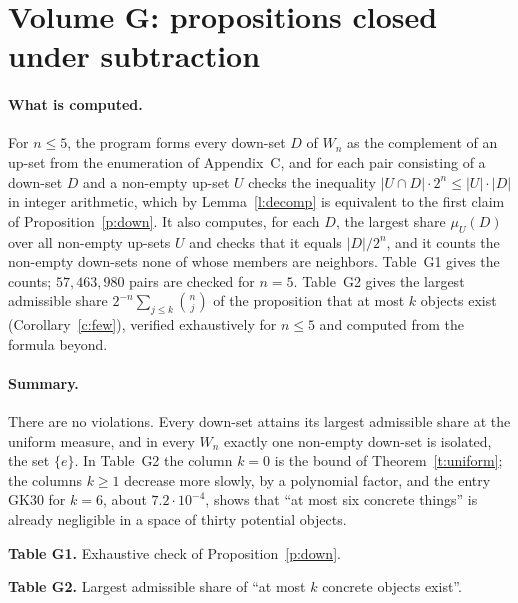 \documentclass{situationist-preprint}
\begin{document}


\section{Volume G: propositions closed under subtraction}\label{app:g}

\paragraph{What is computed.} For $n \leq 5$, the program forms every down-set $D$ of $W_n$ as the complement of an up-set from the enumeration of Appendix~C, and for each pair consisting of a down-set $D$ and a non-empty up-set $U$ checks the inequality $|U \cap D| \cdot 2^n \leq |U| \cdot |D|$ in integer arithmetic, which by Lemma~\ref{l:decomp} is equivalent to the first claim of Proposition~\ref{p:down}. It also computes, for each $D$, the largest share $\mu_U(D)$ over all non-empty up-sets $U$ and checks that it equals $|D|/2^n$, and it counts the non-empty down-sets none of whose members are neighbors. Table~G1 gives the counts; $57{,}463{,}980$ pairs are checked for $n = 5$. Table~G2 gives the largest admissible share $2^{-n}\sum_{j \leq k}\binom{n}{j}$ of the proposition that at most $k$ objects exist (Corollary~\ref{c:few}), verified exhaustively for $n \leq 5$ and computed from the formula beyond.

\paragraph{Summary.} There are no violations. Every down-set attains its largest admissible share at the uniform measure, and in every $W_n$ exactly one non-empty down-set is isolated, the set $\{e\}$. In Table~G2 the column $k = 0$ is the bound of Theorem~\ref{t:uniform}; the columns $k \geq 1$ decrease more slowly, by a polynomial factor, and the entry GK30 for $k = 6$, about $7.2 \cdot 10^{-4}$, shows that \enquote{at most six concrete things} is already negligible in a space of thirty potential objects.

\begin{center}
\textbf{Table G1.} Exhaustive check of Proposition~\ref{p:down}.\\[0.5em]

\end{center}

\begin{center}
\textbf{Table G2.} Largest admissible share of \enquote{at most $k$ concrete objects exist}.
\end{center}

\end{document}
